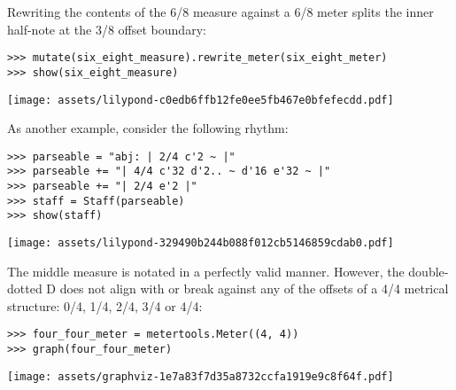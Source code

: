 \noindent Rewriting the contents of the 6/8 measure against a 6/8 meter splits
the inner half-note at the 3/8 offset boundary:

\begin{comment}
<abjad>
mutate(six_eight_measure).rewrite_meter(six_eight_meter)
show(six_eight_measure)
</abjad>
\end{comment}

\begin{singlespacing}
\vspace{-0.5\baselineskip}
\begin{lstlisting}
>>> mutate(six_eight_measure).rewrite_meter(six_eight_meter)
>>> show(six_eight_measure)
\end{lstlisting}
\noindent\texttt{[image: assets/lilypond-c0edb6ffb12fe0ee5fb467e0bfefecdd.pdf]}
\end{singlespacing}

\noindent As another example, consider the following rhythm:

\begin{comment}
<abjad>
parseable = "abj: | 2/4 c'2 ~ |"
parseable += "| 4/4 c'32 d'2.. ~ d'16 e'32 ~ |"
parseable += "| 2/4 e'2 |"
staff = Staff(parseable)
show(staff)
</abjad>
\end{comment}

\begin{singlespacing}
\vspace{-0.5\baselineskip}
\begin{lstlisting}
>>> parseable = "abj: | 2/4 c'2 ~ |"
>>> parseable += "| 4/4 c'32 d'2.. ~ d'16 e'32 ~ |"
>>> parseable += "| 2/4 e'2 |"
>>> staff = Staff(parseable)
>>> show(staff)
\end{lstlisting}
\noindent\texttt{[image: assets/lilypond-329490b244b088f012cb5146859cdab0.pdf]}
\end{singlespacing}

\noindent The middle measure is notated in a perfectly valid manner. However,
the double-dotted D does not align with or break against any of the offsets of
a 4/4 metrical structure: 0/4, 1/4, 2/4, 3/4 or 4/4:

\begin{comment}
<abjad>
four_four_meter = metertools.Meter((4, 4))
graph(four_four_meter)
</abjad>
\end{comment}

\begin{singlespacing}
\vspace{-0.5\baselineskip}
\begin{lstlisting}
>>> four_four_meter = metertools.Meter((4, 4))
>>> graph(four_four_meter)
\end{lstlisting}
\noindent\texttt{[image: assets/graphviz-1e7a83f7d35a8732ccfa1919e9c8f64f.pdf]}
\end{singlespacing}

